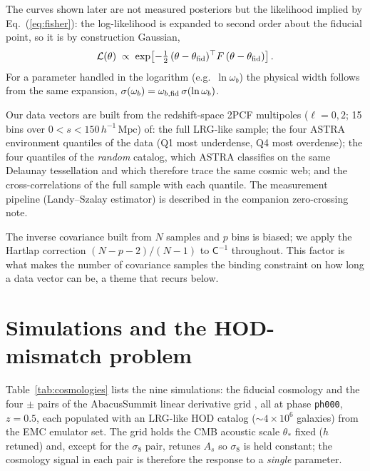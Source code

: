 \documentclass[11pt]{article}
\newcommand{\Mpch}{\,h^{-1}\,\mathrm{Mpc}}
\begin{document}
The curves shown later are not measured posteriors but the likelihood
implied by Eq.~(\ref{eq:fisher}): the log-likelihood is expanded to second
order about the fiducial point, so it is by construction Gaussian,
\begin{equation}
\mathcal{L}(\theta) \;\propto\;
\exp\!\left[ -\tfrac{1}{2}\,(\theta-\theta_{\rm fid})^\top F\,
(\theta-\theta_{\rm fid}) \right].
\label{eq:gauss}
\end{equation}
For a parameter handled in the logarithm (e.g.\ $\ln\omega_b$) the physical
width follows from the same expansion,
$\sigma(\omega_b)=\omega_{b,{\rm fid}}\,\sigma(\ln\omega_b)$.

Our data vectors are built from the redshift-space 2PCF multipoles
($\ell=0,2$; 15 bins over $0<s<150\Mpch$) of: the full LRG-like sample;
the four ASTRA environment quantiles of the data (Q1 most underdense,
Q4 most overdense); the four quantiles of the \emph{random} catalog, which
ASTRA classifies on the same Delaunay tessellation and which therefore
trace the same cosmic web; and the cross-correlations of the full sample
with each quantile.  The measurement pipeline (Landy--Szalay estimator) is
described in the companion zero-crossing note.

The inverse covariance built from $N$ samples and $p$ bins is biased; we
apply the Hartlap correction $(N-p-2)/(N-1)$ \cite{hartlap2007} to
$\mathsf{C}^{-1}$ throughout.  This factor is what makes the number of
covariance samples the binding constraint on how long a data vector can be,
a theme that recurs below.

\section{Simulations and the HOD-mismatch problem}
\label{sec:sims}

Table~\ref{tab:cosmologies} lists the nine simulations: the fiducial
cosmology and the four $\pm$ pairs of the AbacusSummit linear derivative
grid \cite{maksimova2021}, all at phase \texttt{ph000}, $z=0.5$, each
populated with an LRG-like HOD catalog ($\sim4\times10^6$ galaxies) from
the EMC emulator set.  The grid holds the CMB acoustic scale $\theta_\ast$
fixed ($h$ retuned) and, except for the $\sigma_8$ pair, retunes $A_s$ so
$\sigma_8$ is held constant; the cosmology signal in each pair is therefore
the response to a \emph{single} parameter.
\end{document}
